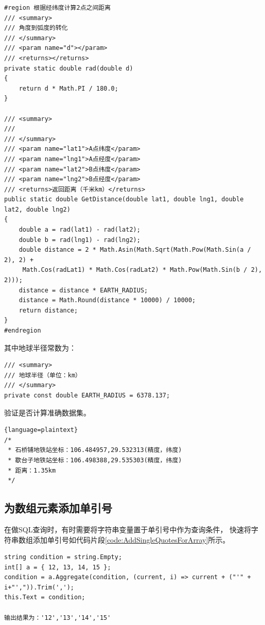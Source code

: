 \documentclass{book}
\begin{document}
\begin{lstlisting}[language={[Sharp]C}]
#region 根据经纬度计算2点之间距离
/// <summary>
/// 角度到弧度的转化
/// </summary>
/// <param name="d"></param>
/// <returns></returns>
private static double rad(double d)
{
    return d * Math.PI / 180.0;
}

/// <summary>
/// 
/// </summary>
/// <param name="lat1">A点纬度</param>
/// <param name="lng1">A点经度</param>
/// <param name="lat2">B点纬度</param>
/// <param name="lng2">B点经度</param>
/// <returns>返回距离（千米km）</returns>
public static double GetDistance(double lat1, double lng1, double lat2, double lng2)
{    
    double a = rad(lat1) - rad(lat2);
    double b = rad(lng1) - rad(lng2);
    double distance = 2 * Math.Asin(Math.Sqrt(Math.Pow(Math.Sin(a / 2), 2) +
     Math.Cos(radLat1) * Math.Cos(radLat2) * Math.Pow(Math.Sin(b / 2), 2)));
    distance = distance * EARTH_RADIUS;
    distance = Math.Round(distance * 10000) / 10000;
    return distance;
}
#endregion
\end{lstlisting}

其中地球半径常数为：

\begin{lstlisting}[language={[Sharp]C}]
/// <summary>
/// 地球半径（单位：km）
/// </summary>
private const double EARTH_RADIUS = 6378.137;
\end{lstlisting}

验证是否计算准确数据集。

\begin{lstlisting}{language=plaintext}
/*
 * 石桥铺地铁站坐标：106.484957,29.532313(精度，纬度)
 * 歇台子地铁站坐标：106.498388,29.535303(精度，纬度)
 * 距离：1.35km
 */
\end{lstlisting}

\subsection{为数组元素添加单引号}

在做SQL查询时，有时需要将字符串变量置于单引号中作为查询条件，
快速将字符串数组添加单引号如代码片段\ref{code:AddSingleQuotesForArray}所示。

\begin{lstlisting}[language={[Sharp]C},caption=为字符串数组添加单引号,label={code:AddSingleQuotesForArray}]
string condition = string.Empty;
int[] a = { 12, 13, 14, 15 };
condition = a.Aggregate(condition, (current, i) => current + ("'" + i+"',")).Trim(',');
this.Text = condition;
 
输出结果为：'12','13','14','15'
\end{lstlisting}
\end{document}
